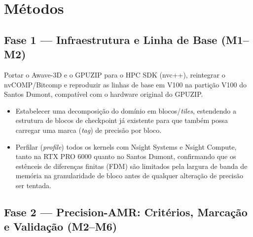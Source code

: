 \documentclass[12pt,a4paper]{article}
\begin{document}
\fi

\iffalse

\section{Métodos}

\subsection{Fase 1 --- Infraestrutura e Linha de Base (M1--M2)}

Portar o Awave-3D e o GPUZIP para o HPC SDK (nvc++), reintegrar o
nvCOMP/Bitcomp e reproduzir as linhas de base em V100 na partição V100 do
Santos Dumont, compatível com o hardware original do GPUZIP.

\begin{itemize}
  \item Estabelecer uma decomposição do domínio em blocos/\emph{tiles},
        estendendo a estrutura de blocos de checkpoint já existente para que
        também possa carregar uma marca (\emph{tag}) de precisão por bloco.
  \item Perfilar (\emph{profile}) todos os kernels com Nsight Systems e Nsight
        Compute, tanto na RTX PRO 6000 quanto no Santos Dumont, confirmando
        que os estênceis de diferenças finitas (FDM) são limitados pela
        largura de banda de memória na granularidade de bloco antes de
        qualquer alteração de precisão ser tentada.
\end{itemize}

\subsection{Fase 2 --- Precision-AMR: Critérios, Marcação e Validação
(M2--M6)}
\end{document}
